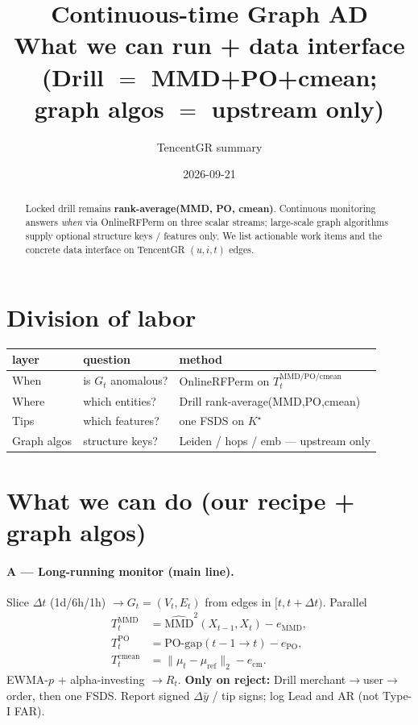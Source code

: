 \documentclass[11pt]{article}
\title{\textbf{Continuous-time Graph AD}\\
\large What we can run + data interface\\
\large (Drill $=$ MMD+PO+cmean; graph algos $=$ upstream only)}
\author{TencentGR summary}
\date{2026-09-21}
\begin{document}
\maketitle

\begin{abstract}
Locked drill remains \textbf{rank-average(MMD, PO, cmean)}.
Continuous monitoring answers \emph{when} via OnlineRFPerm on three
scalar streams; large-scale graph algorithms supply optional
structure keys / features only.
We list actionable work items and the concrete data interface on
TencentGR $(u,i,t)$ edges.
\end{abstract}

\section{Division of labor}
\begin{center}
\begin{tabular}{lll}
\toprule
layer & question & method \\
\midrule
When & is $G_t$ anomalous? & OnlineRFPerm on $T_t^{\mathrm{MMD/PO/cmean}}$ \\
Where & which entities? & Drill rank-average(MMD,PO,cmean) \\
Tips & which features? & one FSDS on $K^\star$ \\
Graph algos & structure keys? & Leiden / hops / emb --- upstream only \\
\bottomrule
\end{tabular}
\end{center}

\section{What we can do (our recipe + graph algos)}

\paragraph{A --- Long-running monitor (main line).}
Slice $\Delta t$ (1d/6h/1h) $\to G_t=(V_t,E_t)$ from edges in
$[t,t+\Delta t)$. Parallel
\begin{align*}
  T_t^{\mathrm{MMD}}&=\widehat{\mathrm{MMD}}^2(X_{t-1},X_t)-e_{\mathrm{MMD}},\\
  T_t^{\mathrm{PO}}&=\mathrm{PO\text{-}gap}(t-1\to t)-e_{\mathrm{PO}},\\
  T_t^{\mathrm{cmean}}&=\|\mu_t-\mu_{\mathrm{ref}}\|_2-e_{\mathrm{cm}}.
\end{align*}
EWMA-$p$ + alpha-investing $\to R_t$.
\textbf{Only on reject:} Drill merchant$\to$user$\to$order, then one FSDS.
Report signed $\Delta\bar y$ / tip signs; log Lead and AR (not Type-I FAR).
\end{document}
